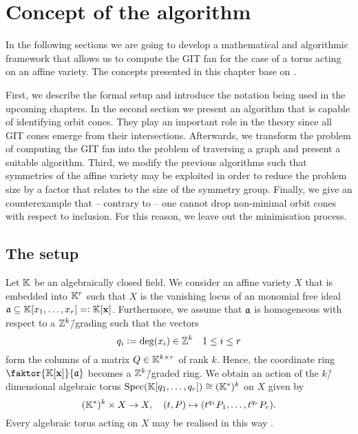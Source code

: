 



\label{algorithm:main}

\chapter{Concept of the algorithm}
\label{chap:algorithm}

In the following sections we are going to develop a mathematical and algorithmic framework that allows us to compute the GIT fan for the case of a torus acting on an affine variety. The concepts presented in this chapter base on \cite{gitfan_symmetry, gitfan}.

First, we describe the formal setup and introduce the notation being used in the upcoming chapters. In the second section we present an algorithm that is capable of identifying orbit cones. They play an important role in the theory since all GIT cones emerge from their intersections. Afterwards, we transform the problem of computing the GIT fan into the problem of traversing a graph and present a suitable algorithm. Third, we modify the previous algorithms such that symmetries of the affine variety may be exploited in order to reduce the problem size by a factor that relates to the size of the symmetry group. Finally, we give an counterexample that -- contrary to \cite{gitfan_symmetry} -- one cannot drop non-minimal orbit cones with respect to inclusion. For this reason, we leave out the minimisation process.

\section{The setup}

Let $\mathbb{K}$ be an algebraically closed field.
%
We consider an affine variety $X$ that is embedded into $\mathbb{K}^r$ such that $X$ is the vanishing locus of an monomial free ideal $\mathfrak{a}\subseteq \mathbb{K}[x_1,\dots,x_r]=\mathrel{\mathop:} \mathbb{K}[\mathbf{x}]$.
%
%
%
Furthermore, we assume that $\mathfrak{a}$ is homogeneous with respect to a $\mathbb{Z}^k$\=/grading such that the vectors 
$$q_i\mathrel{\mathop:}= \deg(x_i)\in\mathbb{Z}^k\quad 1\leq i \leq r$$
form the columns of a matrix $Q\in\mathbb{K}^{k\times r}$ of rank $k$.
%
%
%
Hence, the coordinate ring $\faktor{\field[\mathbf{x}]}{\ideal}$ becomes a $\mathbb{Z}^k$\=/graded ring. We obtain an action of the $k$\=/dimensional algebraic torus $\text{Spec}(\mathbb{K}[q_1,\dots,q_r])\cong (\mathbb{K}^*)^k$ on $X$ given by
$$(\mathbb{K}^*)^k \times X \rightarrow X,\quad (t,P) \mapsto (t^{q_1}P_1,\dots,t^{q_r}P_r).$$
Every algebraic torus acting on $X$ may be realised in this way .

